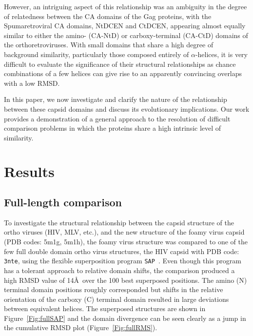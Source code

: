 \documentclass{bmcart}
\newcommand{\A}{$\alpha$}
\newcommand{\SAP}{{\tt SAP}}
\newcommand{\Fig}[1]{Figure~\ref{Fig:#1}}
\begin{document}
However, an intriguing aspect of this relationship was an ambiguity in the degree of relatedness between the CA domains 
of the Gag proteins, with the Spumaretroviral CA domains, NtDCEN and CtDCEN, appearing almost equally similar to either 
the amino- (CA-NtD) or carboxy-terminal (CA-CtD) domains of the orthoretroviruses.
With small domains that share a high degree of background similarity, particularly those composed entirely of \A-helices,
it is very difficult to evaluate the significance of their structural relationships as chance combinations of a few
helices can give rise to an apparently convincing overlaps with a low RMSD.

In this paper, we now investigate and clarify the nature of the relationship between these capsid domains and discuss 
its evolutionary implications.  Our work provides a demonstration of a general approach to the resolution of
difficult comparison problems in which the proteins share a high intrinsic level of similarity.


\section*{Results}

\subsection*{Full-length comparison}

To investigate the structural relationship between the capsid structure of the ortho viruses (HIV, MLV, etc.),
and the new structure of the foamy virus capsid \cite{BallNJet16} (PDB codes: 5m1g, 5m1h), the foamy virus structure was
compared to one of the few full double domain ortho virus structures, the HIV capsid with PDB code: {\tt 3nte},
using the flexible superposition program \SAP\ \cite{TaylorWR99a}.   Even though this program has a tolerant approach
to relative domain shifts, the comparison produced a high RMSD value of 14\AA\ over the 100 best superposed
positions.   The amino (N) terminal domain positions roughly corresponded but shifts in the relative
orientation of the carboxy (C) terminal domain resulted in large deviations between equivalent helices.
The superposed structures are shown in \Fig{fullSAP} and the domain divergence can be seen clearly as a
jump in the cumulative RMSD plot (\Fig{fullRMS}).
\end{document}
